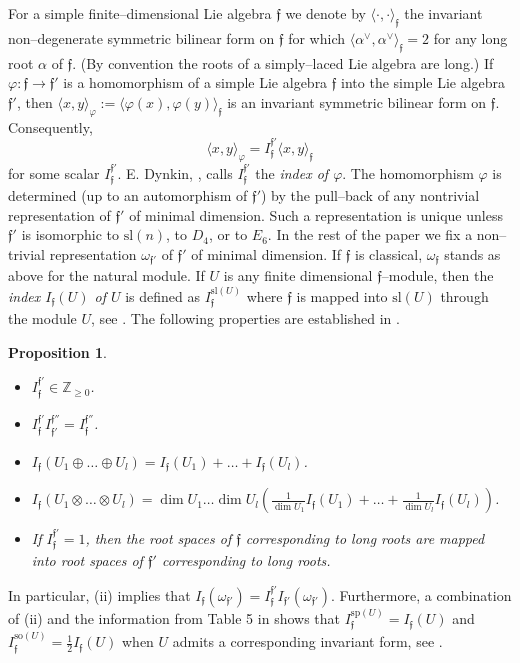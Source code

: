 \documentclass[oneside,leqno,12pt]{article}
\newcounter{theorem}
\newtheorem{prop}[theo]{Proposition}
\def\gf{\mathfrak{f}}
\def\Z{\mathbb{Z}}
\renewcommand {\phi} {\varphi}
\renewcommand{\sp}{\mathrm{sp}}
\renewcommand{\sl}{\mathrm{sl}}
\newcommand{\so}{\mathrm{so}}
\begin{document}
For a simple finite--dimensional Lie algebra $\gf$ we denote by $\langle \cdot, \cdot \rangle_\gf$ the invariant non--degenerate symmetric bilinear 
form on $\gf$ 
for which $\langle\alpha^\vee,\alpha^\vee\rangle_\gf =2$ for any long root $\alpha$ of $\gf$. 
(By convention the roots of a simply--laced Lie algebra are long.)
 If $\phi:\gf\to\gf'$ is a homomorphism of a simple Lie algebra 
$\gf$ into the simple Lie algebra $\gf'$, then $\langle x,y\rangle_\phi:=\langle \phi(x),\phi(y)\rangle_\gf$ is an invariant symmetric bilinear 
form on $\gf$. Consequently, 
\[\langle x,y\rangle_\phi=I_\gf^{\gf'}\langle x, y\rangle_\gf\]
for some scalar $I_\gf^{\gf'}$. E. Dynkin, \cite{Dy2}, calls $I_\gf^{\gf'}$ the \emph{index of $\phi$}. 
The homomorphism $\phi$ is determined (up to an automorphism of $\gf'$) by the pull--back of any nontrivial representation of $\gf'$ of minimal dimension.
Such a representation is unique unless $\gf'$ is isomorphic to $\sl(n)$, to $D_4$,  or to $E_6$.
In the rest of the paper we fix  a non--trivial representation $\omega_{\gf'}$ of $\gf'$ of minimal dimension. 
If $\gf$ is classical, $\omega_\gf$ stands as above for the natural module.
 If $U$ is any  finite dimensional $\gf$--module, then the {\it index $I_\gf(U)$ of $U$}  is defined as  $I_\gf^{\sl(U)}$ 
where $\gf$ is mapped into $\sl(U)$ through the module $U$, see \cite{Dy2}. 
The following properties are established in \cite[$\S$ 2]{Dy2}.
\begin{prop}\label{propDyIndex} $\phantom{x}$
\begin{itemize}
\item[\rm{(i)}] $I_\gf^{\gf'}\in\Z_{\geq 0}$.
\item[\rm{(ii)}] $I_\gf^{\gf'} I_{\gf'}^{\gf''}=I_\gf^{\gf''}$.
\item[\rm{(iii)}] $I_\gf (U_1\oplus \dots \oplus U_l)=I_\gf (U_1)+\dots +I_\gf (U_l)$.
\item[\rm{(iv)}] $I_\gf (U_1\otimes \dots \otimes U_l)=\dim U_1\dots\dim U_l (\frac{1}{\dim U_1}I_\gf (U_1)+\dots +\frac{1}{\dim U_l}I_\gf (U_l))$.
\item[\rm{(v)}] If $I_\gf^{\gf'}=1$, then the root spaces of $\gf$ corresponding to long roots are mapped into root spaces of $\gf'$
corresponding to long roots. 
\end{itemize}
\end{prop}  

In particular, (ii) implies that  $I_\gf(\omega_{\gf'}) =  I_{\gf}^{\gf'} I_{\gf'}(\omega_{\gf'})$. Furthermore, a  combination of (ii)
and the information from Table 5 in \cite{Dy2} shows that 
$I_\gf^{\sp(U)} = I_\gf(U)$ and $I_\gf^{\so(U)} = \frac{1}{2} I_\gf(U)$ when $U$ admits a corresponding invariant form, see \cite{Dy2}.
\end{document}
